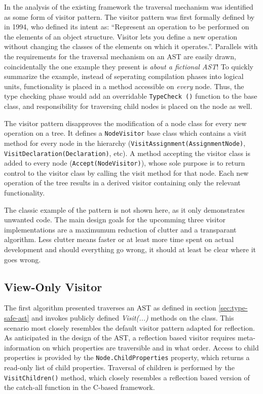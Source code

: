 \documentclass[twoside,openright]{uva-bachelor-thesis}
\newcommand{\code}[1]{\texttt{\footnotesize#1}}
\begin{document}
		In the analysis of the existing framework the traversal mechanism was identified as some form of visitor pattern. The visitor pattern was first formally defined by \citeauthor{gof1994} in 1994, who defined its intent as: ``Represent an operation to be performed on the elements of an object structure. Visitor lets you define a new operation without changing the classes of the elements on which it operates.''. Parallels with the requirements for the traversal mechanism on an AST are easily drawn, coincidentally the one example they present is \emph{about a fictional AST}! To quickly summarize the example, instead of seperating compilation phases into logical units, functionality is placed in a method accessible on \emph{every} node. Thus, the type checking phase would add an overridable \code{TypeCheck ()} function to the base class, and responsibility for traversing child nodes is placed on the node as well.
		
		The visitor pattern disapproves the modification of a node class for every new operation on a tree. It defines a \code{NodeVisitor} base class which contains a visit method for every node in the hierarchy (\code{VisitAssignment(AssignmentNode)}, \code{VisitDeclaration(Declaration)}, etc). A method accepting the visitor class is added to every node (\code{Accept(NodeVisitor)}), whose sole purpose is to return control to the visitor class by calling the visit method for that node. Each new operation of the tree results in a derived visitor containing only the relevant functionality.
		
		The classic example of the pattern is not shown here, as it only demonstrates unwanted code. The main design goals for the upcomming three visitor implementations are a maximumum reduction of clutter and a transparant algorithm. Less clutter means faster or at least more time spent on actual development and should everything go wrong, it should at least be clear where it goes wrong.
		
		\subsection{View-Only Visitor}
			The first algorithm presented traverses an AST as defined in section \ref{sec:type-safe-ast} and invokes publicly defined \emph{Visit(...)} methods on the class. This scenario most closely resembles the default visitor pattern adapted for reflection. As anticipated in the design of the AST, a reflection based visitor requires meta-information on which properties are traversible and in what order. Access to child properties is provided by the \code{Node.ChildProperties} property, which returns a read-only list of child properties. Traversal of children is performed by the \code{VisitChildren()} method, which closely resembles a reflection based version of the catch-all function in the C-based framework. 
			
\end{document}
